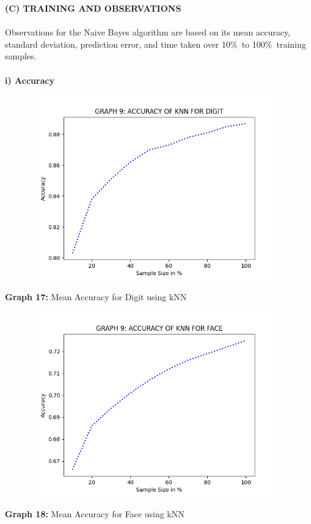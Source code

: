 \documentclass[10 pt]{report}   	%
\begin{document}
{{\textbf{(C) TRAINING AND OBSERVATIONS} \\ \\
Observations for the Naive Bayes algorithm are based on its mean accuracy, standard deviation, prediction error, and time taken over 10\%\ to 100\%\ training samples. \\ \\
\textbf{i) Accuracy}
\begin{figure} [H]
\includegraphics [width = 11cm, height = 8cm]{KNN_ACC_DIGIT.png}
\end {figure}
\begin{center}
\small \textbf {Graph 17:} Mean Accuracy for Digit using kNN\\
\end{center}
\begin{figure} [H]
\includegraphics [width = 11cm, height = 8cm]{KNN_ACC_FACE.png}
\end {figure}
\begin{center}
\small \textbf {Graph 18:} Mean Accuracy for Face using kNN\\

\end{center}}}
\end{document}
